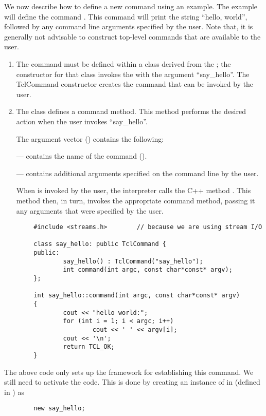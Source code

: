 \documentclass{article}
\begin{document}
We now describe how to define a new command using an example.
The example will define the command .
This command will print the string ``hello, world'',
followed by any command line arguments specified by the user.
Note that, it is generally not advisable to construct
top-level commands that are available to the user.
\begin{enumerate}
\item The command must be defined within a class
  derived from the ;
  the constructor for that class invokes the
  with the argument ``say\_hello''.
  The TclCommand constructor
  creates the command that can be invoked by the user.

\item  The class defines a command method.
  This method performs the desired action when the user invokes 
  ``say\_hello''.

  The argument vector () contains the following:
  
  ---  contains the name of the command ().

  ---  contains additional arguments
  specified on the command line by the user.

  \danger
  When  is invoked by the user,
  the interpreter calls the C++ method
  .
  This method then, in turn, invokes the appropriate command method,
  passing it any arguments that were specified by the user.
  \closedanger
\end{enumerate}
\begin{verbatim}
        #include <streams.h>        // because we are using stream I/O

        class say_hello: public TclCommand {
        public:
                say_hello() : TclCommand("say_hello");
                int command(int argc, const char*const* argv);
        };

        int say_hello::command(int argc, const char*const* argv)
        {
                cout << "hello world:";
                for (int i = 1; i < argc; i++)
                        cout << ' ' << argv[i];
                cout << '\n';
                return TCL_OK;
        }
\end{verbatim}
The above code only sets up the framework for establishing this command.
We still need to activate the code.
This is done by creating an instance of  in 
(defined in ) as
\begin{verbatim}
        new say_hello;
\end{verbatim}
\end{document}
